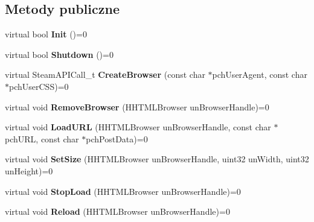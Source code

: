 \subsection*{Metody publiczne}
\begin{DoxyCompactItemize}
\item 
\mbox{\label{class_i_steam_h_t_m_l_surface_a1bd2c165e2cdd316e4f227a6adf3d98b}} 
virtual bool {\bfseries Init} ()=0
\item 
\mbox{\label{class_i_steam_h_t_m_l_surface_a0e44754a153eca6ebd9cd4e8d7d60ccc}} 
virtual bool {\bfseries Shutdown} ()=0
\item 
\mbox{\label{class_i_steam_h_t_m_l_surface_ae44cef213b858f70df2a4142cec93356}} 
virtual Steam\+A\+P\+I\+Call\+\_\+t {\bfseries Create\+Browser} (const char $\ast$pch\+User\+Agent, const char $\ast$pch\+User\+C\+SS)=0
\item 
\mbox{\label{class_i_steam_h_t_m_l_surface_a6033a643a13112972847fc73532b1fe8}} 
virtual void {\bfseries Remove\+Browser} (H\+H\+T\+M\+L\+Browser un\+Browser\+Handle)=0
\item 
\mbox{\label{class_i_steam_h_t_m_l_surface_a1d5a21a85db5535b4a05fbab739539e2}} 
virtual void {\bfseries Load\+U\+RL} (H\+H\+T\+M\+L\+Browser un\+Browser\+Handle, const char $\ast$pch\+U\+RL, const char $\ast$pch\+Post\+Data)=0
\item 
\mbox{\label{class_i_steam_h_t_m_l_surface_a740f1a05a2774324954a5b31f204cdca}} 
virtual void {\bfseries Set\+Size} (H\+H\+T\+M\+L\+Browser un\+Browser\+Handle, uint32 un\+Width, uint32 un\+Height)=0
\item 
\mbox{\label{class_i_steam_h_t_m_l_surface_a1753fec92347e999535eb1dc595a41f5}} 
virtual void {\bfseries Stop\+Load} (H\+H\+T\+M\+L\+Browser un\+Browser\+Handle)=0
\item 
\mbox{\label{class_i_steam_h_t_m_l_surface_a38f7f6daf4023170f6cffd1d651db32c}} 
virtual void {\bfseries Reload} (H\+H\+T\+M\+L\+Browser un\+Browser\+Handle)=0

\end{DoxyCompactItemize}
